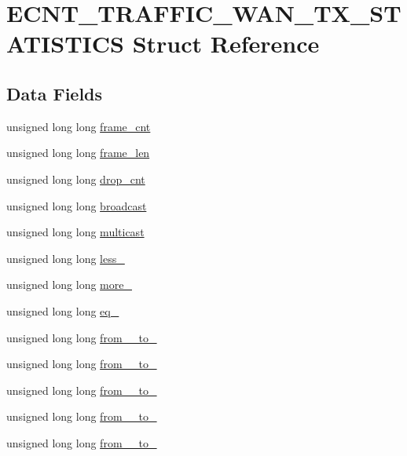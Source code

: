 \hypertarget{structECNT__TRAFFIC__WAN__TX__STATISTICS}{}\section{E\+C\+N\+T\+\_\+\+T\+R\+A\+F\+F\+I\+C\+\_\+\+W\+A\+N\+\_\+\+T\+X\+\_\+\+S\+T\+A\+T\+I\+S\+T\+I\+CS Struct Reference}
\label{structECNT__TRAFFIC__WAN__TX__STATISTICS}
\subsection*{Data Fields}
\begin{DoxyCompactItemize}
\item 
unsigned long long \hyperlink{structECNT__TRAFFIC__WAN__TX__STATISTICS_af61b5c3aea1910f0de1b60a9734cb956}{frame\+\_\+cnt}
\item 
unsigned long long \hyperlink{structECNT__TRAFFIC__WAN__TX__STATISTICS_a9a7939744aa9ae2a3a3e052d25053c89}{frame\+\_\+len}
\item 
unsigned long long \hyperlink{structECNT__TRAFFIC__WAN__TX__STATISTICS_ab6834783c3ed69327fefa2f396b8a6af}{drop\+\_\+cnt}
\item 
unsigned long long \hyperlink{structECNT__TRAFFIC__WAN__TX__STATISTICS_ae657af97eb0f43f7e17d3b87b2d4a915}{broadcast}
\item 
unsigned long long \hyperlink{structECNT__TRAFFIC__WAN__TX__STATISTICS_af25139f9acd8f8010b23c3e162dccff6}{multicast}
\item 
unsigned long long \hyperlink{structECNT__TRAFFIC__WAN__TX__STATISTICS_a03d1fb015f8756bab35ba11bc7b23eec}{less\+\_}
\item 
unsigned long long \hyperlink{structECNT__TRAFFIC__WAN__TX__STATISTICS_a7a4745d9d927b076aa994fee3c66c514}{more\+\_}
\item 
unsigned long long \hyperlink{structECNT__TRAFFIC__WAN__TX__STATISTICS_ad4b07053fd91270c31dd308c66e39c56}{eq\+\_}
\item 
unsigned long long \hyperlink{structECNT__TRAFFIC__WAN__TX__STATISTICS_a6013456064b4baf8867812bc918a85ce}{from\+\_\+\_\+to\+\_}
\item 
unsigned long long \hyperlink{structECNT__TRAFFIC__WAN__TX__STATISTICS_a36f09ee3b620bb29729a8d518766f765}{from\+\_\+\_\+to\+\_}
\item 
unsigned long long \hyperlink{structECNT__TRAFFIC__WAN__TX__STATISTICS_a73e1145853a15fa8aae848677a2cbcea}{from\+\_\+\_\+to\+\_}
\item 
unsigned long long \hyperlink{structECNT__TRAFFIC__WAN__TX__STATISTICS_a1b5fa5821d008c81b149a4581a784281}{from\+\_\+\_\+to\+\_}
\item 
unsigned long long \hyperlink{structECNT__TRAFFIC__WAN__TX__STATISTICS_a716e91129a67e1c3a62a3832a0f6c54e}{from\+\_\+\_\+to\+\_}
\end{DoxyCompactItemize}


